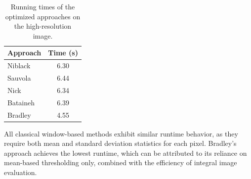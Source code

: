 \begin{table}[t]
    \begin{tabular}{lc}
        Approach & Time (s) \\
        \hline
        Niblack  & 6.30 \\
        Sauvola  & 6.44 \\
        Nick     & 6.34 \\
        Bataineh & 6.39 \\
        Bradley  & 4.55 
    \end{tabular}
    \caption{Running times of the optimized approaches on the high-resolution image.}
    \label{tab:table_compare}
\end{table}

All classical window-based methods exhibit similar runtime behavior, as they require both mean and standard deviation statistics for each pixel.
Bradley's approach achieves the lowest runtime, which can be attributed to its reliance on mean-based thresholding only, combined with the efficiency of integral image evaluation.
